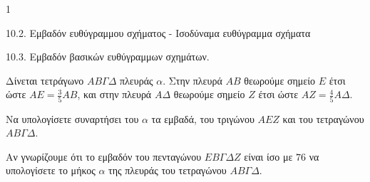 \begin{ylh}{1}
    \item 10.2. Εμβαδόν ευθύγραμμου σχήματος - Ισοδύναμα ευθύγραμμα σχήματα
    \item 10.3. Εμβαδόν βασικών ευθύγραμμων σχημάτων.
\end{ylh}
\begin{figure} %
\end{figure}


Δίνεται τετράγωνο $ΑΒΓΔ$ πλευράς $\alpha$. Στην πλευρά $ΑΒ$ θεωρούμε σημείο $Ε$ έτσι ώστε $AE = \frac{3}{5} AB$, και στην πλευρά $ΑΔ$ θεωρούμε σημείο $Ζ$ έτσι ώστε $AZ = \frac{4}{5} ΑΔ$.
\begin{alist}
\item Να υπολογίσετε συναρτήσει του $\alpha$ τα εμβαδά, του τριγώνου $AEZ$ και του τετραγώνου $ΑΒΓΔ$. 
\item Αν γνωρίζουμε ότι το εμβαδόν του πενταγώνου $ΕΒΓΔΖ$ είναι ίσο με $76$ να υπολογίσετε το μήκος $\alpha$ της πλευράς του τετραγώνου $ΑΒΓΔ$. 
\end{alist}